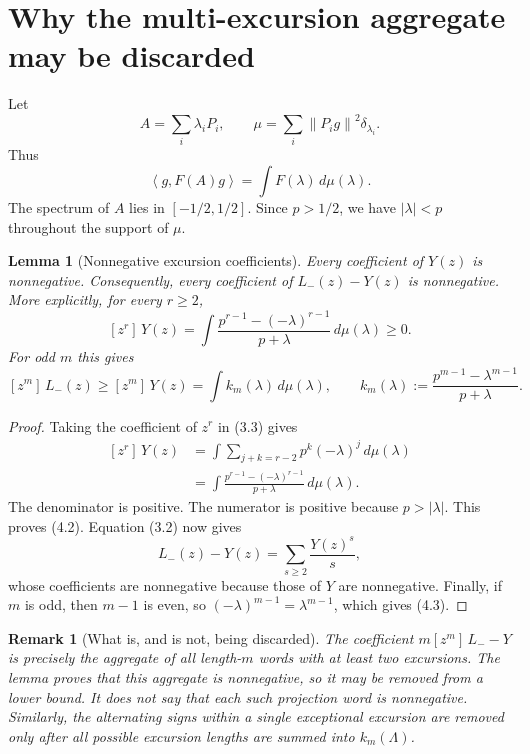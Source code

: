 \documentclass[11pt]{article}
\newtheorem{lemma}[proposition]{Lemma}
\newtheorem{remark}[proposition]{Remark}
\newcommand{\ip}[2]{\left\langle #1,#2\right\rangle}
\newcommand{\norm}[1]{\left\lVert #1\right\rVert}
\newcommand{\coeff}[2]{[z^{#1}]\,#2}
\begin{document}
\section{Why the multi-excursion aggregate may be discarded}

Let
\[
  A=\sum_i\lambda_iP_i,
  \qquad
  \mu=\sum_i\norm{P_ig}^2\delta_{\lambda_i}.
  \tag{4.1}
\]
Thus
\[
  \ip{g}{F(A)g}=\int F(\lambda)\,d\mu(\lambda).
\]
The spectrum of $A$ lies in $[-1/2,1/2]$.  Since $p>1/2$, we have
$|\lambda|<p$ throughout the support of $\mu$.

\begin{lemma}[Nonnegative excursion coefficients]
Every coefficient of $Y(z)$ is nonnegative.  Consequently, every coefficient
of $L_-(z)-Y(z)$ is nonnegative.  More explicitly, for every $r\geq2$,
\[
  \coeff{r}{Y(z)}
  =\int
    \frac{p^{r-1}-(-\lambda)^{r-1}}{p+\lambda}
    \,d\mu(\lambda)
  \geq0.
  \tag{4.2}
\]
For odd $m$ this gives
\[
  \coeff{m}{L_-(z)}
  \geq\coeff{m}{Y(z)}
  =\int k_m(\lambda)\,d\mu(\lambda),
  \qquad
  k_m(\lambda):=\frac{p^{m-1}-\lambda^{m-1}}{p+\lambda}.
  \tag{4.3}
\]
\end{lemma}

\begin{proof}
Taking the coefficient of $z^r$ in (3.3) gives
\[
\begin{aligned}
  \coeff{r}{Y(z)}
  &=\int\sum_{j+k=r-2}p^k(-\lambda)^j\,d\mu(\lambda)\\
  &=\int
    \frac{p^{r-1}-(-\lambda)^{r-1}}{p+\lambda}
    \,d\mu(\lambda).
\end{aligned}
\]
The denominator is positive.  The numerator is positive because
$p>|\lambda|$.  This proves (4.2).  Equation (3.2) now gives
\[
  L_-(z)-Y(z)=\sum_{s\geq2}\frac{Y(z)^s}{s},
\]
whose coefficients are nonnegative because those of $Y$ are nonnegative.
Finally, if $m$ is odd, then $m-1$ is even, so
$(-\lambda)^{m-1}=\lambda^{m-1}$, which gives (4.3).
\end{proof}

\begin{remark}[What is, and is not, being discarded]
The coefficient $m\coeff{m}{L_--Y}$ is precisely the aggregate of all
length-$m$ words with at least two excursions.  The lemma proves that this
aggregate is nonnegative, so it may be removed from a lower bound.  It does
not say that each such projection word is nonnegative.  Similarly, the
alternating signs within a single exceptional excursion are removed only
after all possible excursion lengths are summed into $k_m(\Lambda)$.
\end{remark}
\end{document}
